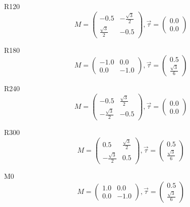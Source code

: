 \documentclass[12pt, fleqn]{article}
\begin{document}
R120
\begin{equation}
    M=
    \begin{pmatrix}
        -0.5&-\frac{\sqrt{3}}{2}\\
        \frac{\sqrt{3}}{2}&-0.5
    \end{pmatrix}
    ,\vec{\tau}=
    \begin{pmatrix}
        0.0\\
        0.0
    \end{pmatrix}
    \label{R120}
\end{equation}

R180
\begin{equation}
    M=
    \begin{pmatrix}
        -1.0&0.0\\
        0.0&-1.0
    \end{pmatrix}
    ,\vec{\tau}=
    \begin{pmatrix}
        0.5\\
        \frac{\sqrt{3}}{6}
    \end{pmatrix}
    \label{R180}
\end{equation}

R240
\begin{equation}
    M=
    \begin{pmatrix}
        -0.5&\frac{\sqrt{3}}{2}\\
        -\frac{\sqrt{3}}{2}&-0.5
    \end{pmatrix}
    ,\vec{\tau}=
    \begin{pmatrix}
        0.0\\
        0.0
    \end{pmatrix}
    \label{R240}
\end{equation}

R300
\begin{equation}
    M=
    \begin{pmatrix}
        0.5&\frac{\sqrt{3}}{2}\\
        -\frac{\sqrt{3}}{2}&0.5
    \end{pmatrix}
    ,\vec{\tau}=
    \begin{pmatrix}
        0.5\\
        \frac{\sqrt{3}}{6}
    \end{pmatrix}
    \label{R300}
\end{equation}

M0
\begin{equation}
    M=
    \begin{pmatrix}
        1.0&0.0\\
        0.0&-1.0
    \end{pmatrix}
    ,\vec{\tau}=
    \begin{pmatrix}
        0.5\\
        \frac{\sqrt{3}}{6}
    \end{pmatrix}
    \label{M0}
\end{equation}
\end{document}
